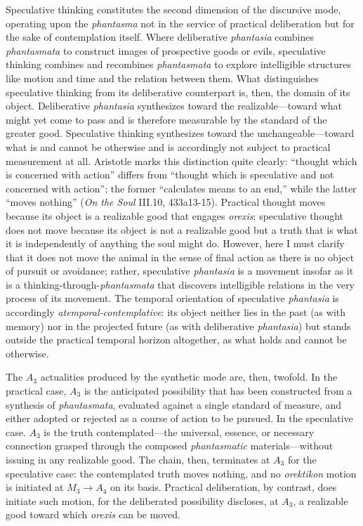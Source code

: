 \documentclass{article}
\begin{document}
Speculative thinking constitutes the second dimension of the discursive mode, operating upon the \textit{phantasma} not in the service of practical deliberation but for the sake of contemplation itself. Where deliberative \textit{phantasia} combines \textit{phantasmata} to construct images of prospective goods or evils, speculative thinking combines and recombines \textit{phantasmata} to explore intelligible structures like motion and time and the relation between them. What distinguishes speculative thinking from its deliberative counterpart is, then, the domain of its object. Deliberative \textit{phantasia} synthesizes toward the realizable---toward what might yet come to pass and is therefore measurable by the standard of the greater good. Speculative thinking synthesizes toward the unchangeable---toward what is and cannot be otherwise and is accordingly not subject to practical measurement at all. Aristotle marks this distinction quite clearly: ``thought which is concerned with action'' differs from ``thought which is speculative and not concerned with action''; the former ``calculates means to an end,'' while the latter ``moves nothing'' (\textit{On the Soul} III.10, 433a13-15).  Practical thought moves because its object is a realizable good that engages \textit{orexis}; speculative thought does not move because its object is not a realizable good but a truth that is what it is independently of anything the soul might do. However, here I must clarify that it does not move the animal in the sense of final action as there is no object of pursuit or avoidance; rather, speculative \textit{phantasia} is a movement insofar as it is a thinking-through-\textit{phantasmata} that discovers intelligible relations in the very process of its movement. The temporal orientation of speculative \textit{phantasia} is accordingly \textit{atemporal-contemplative}: its object neither lies in the past (as with memory) nor in the projected future (as with deliberative \textit{phantasia}) but stands outside the practical temporal horizon altogether, as what holds and cannot be otherwise. 

The $A_3$ actualities produced by the synthetic mode are, then, twofold. In the practical case, $A_3$ is the anticipated possibility that has been constructed from a synthesis of \textit{phantasmata}, evaluated against a single standard of measure, and either adopted or rejected as a course of action to be pursued. In the speculative case. $A_3$ is the truth contemplated---the universal, essence, or necessary connection grasped through the composed \textit{phantasmatic} materials---without issuing in any realizable good. The chain, then, terminates at $A_3$ for the speculative case: the contemplated truth moves nothing, and no \textit{orektikon} motion is initiated at $M_3 \to A_4$ on its basis. Practical deliberation, by contrast, does initiate such motion, for the deliberated possibility discloses, at $A_3$, a realizable good toward which \textit{orexis} can be moved.
\end{document}

